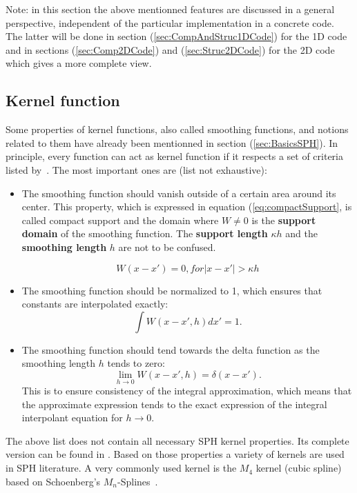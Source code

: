 \documentclass{report}
\begin{document}
Note: in this section the above mentionned features are discussed in a general perspective, independent of the particular implementation in a concrete code. The latter will be done in section (\ref{sec:CompAndStruc1DCode}) for the 1D code and in sections (\ref{sec:Comp2DCode}) and (\ref{sec:Struc2DCode}) for the 2D code which gives a more complete view.




\subsection{Kernel function}
\label{sec:KernelFunction}


Some properties of kernel functions, also called smoothing functions, and notions related
to them have already been mentionned in section
(\ref{sec:BasicsSPH}). In principle, every function can act as kernel function
if it respects a set of criteria listed by~\cite{Liu2003}.
The most important ones are (list not exhaustive):
\begin{itemize}
\item The smoothing function should vanish outside of a certain area around its
center. This property, which is expressed in equation (\ref{eq:compactSupport}, is called compact support and the domain where $W\neq0$
is the {\bf support domain} of the smoothing function. The {\bf support length} $\kappa h$ and the
{\bf smoothing length} $h$ are not to be confused.
 
\begin{equation}
\label{eq:compactSupport}
W(x-x')=0,\textit{for}|x-x'|>\kappa h
\end{equation}

\item The smoothing function should be normalized to 1, which ensures that constants
are interpolated exactly:
\begin{equation}
\int{W(x-x',h)dx'}=1.
\end{equation}

\item The smoothing function should tend towards the delta function as the smoothing
length $h$ tends to zero:
\begin{equation}
\lim\limits_{h \rightarrow 0}{W(x-x',h)}=\delta(x-x').
\end{equation}
This is to ensure consistency of the integral approximation, which means that
the approximate expression tends to the exact expression of the integral
interpolant equation for $h \rightarrow 0$.
\end{itemize}
The above list does not contain all necessary SPH kernel properties. Its complete version can be found in  \cite{Liu2003}.
Based on those properties a variety of kernels are used in SPH literature. A
very commonly used kernel is the $M_4$ kernel (cubic spline) based on Schoenberg's
$M_n$-Splines~\cite{Schoenberg1946}.
\end{document}

